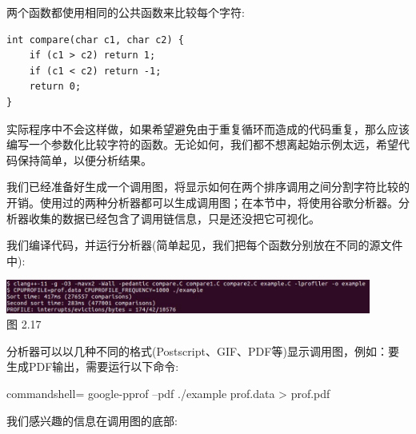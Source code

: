 两个函数都使用相同的公共函数来比较每个字符:

\begin{lstlisting}[style=styleCXX]
int compare(char c1, char c2) {
	if (c1 > c2) return 1;
	if (c1 < c2) return -1;
	return 0;
}
\end{lstlisting}

实际程序中不会这样做，如果希望避免由于重复循环而造成的代码重复，那么应该编写一个参数化比较字符的函数。无论如何，我们都不想离起始示例太远，希望代码保持简单，以便分析结果。

我们已经准备好生成一个调用图，将显示如何在两个排序调用之间分割字符比较的开销。使用过的两种分析器都可以生成调用图；在本节中，将使用谷歌分析器。分析器收集的数据已经包含了调用链信息，只是还没把它可视化。

我们编译代码，并运行分析器(简单起见，我们把每个函数分别放在不同的源文件中):

\begin{center}
\includegraphics[width=0.9\textwidth]{content/1/chapter2/images/17.jpg}\\
图 2.17
\end{center}

分析器可以以几种不同的格式(Postscript、GIF、PDF等)显示调用图，例如：要生成PDF输出，需要运行以下命令:

\begin{tcblisting}{commandshell={}}
google-pprof --pdf ./example prof.data > prof.pdf
\end{tcblisting}

我们感兴趣的信息在调用图的底部:


